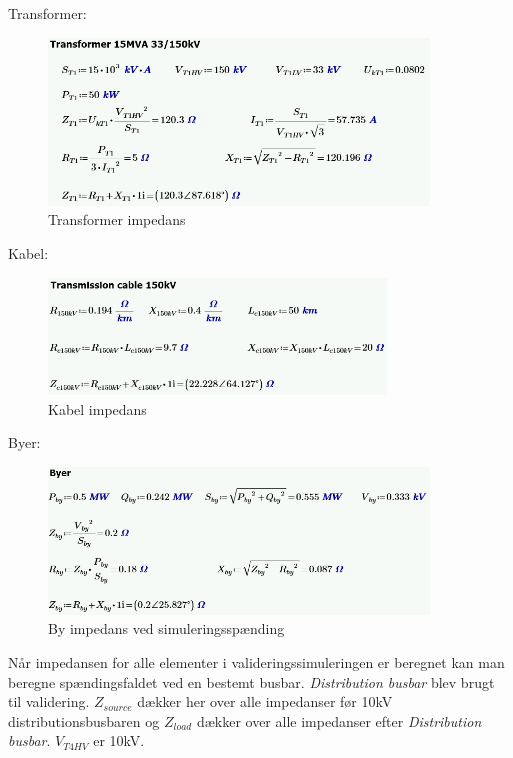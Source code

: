 Transformer:
\begin{figure}[H] %
	\centering
	\includegraphics[width=0.9\textwidth]{figurer/Transformer_validering}
	\caption{Transformer impedans}
	\label{fig:Trafoimpedans}
\end{figure}

Kabel:
\begin{figure}[H] %
	\centering
	\includegraphics[width=0.8\textwidth]{figurer/Kabel_validering}
	\caption{Kabel impedans}
	\label{fig:Kabelimpedans}
\end{figure}

Byer:
\begin{figure}[H] %
	\centering
	\includegraphics[width=0.9\textwidth]{figurer/By_validering}
	\caption{By impedans ved simuleringsspænding}
	\label{fig:Byimpedans}
\end{figure}

 Når impedansen for alle elementer i valideringssimuleringen er beregnet kan man beregne spændingsfaldet ved en bestemt busbar. \textit{Distribution busbar} blev brugt til validering. $Z_{source}$ dækker her over alle impedanser før 10kV distributionsbusbaren og $Z_{load}$ dækker over alle impedanser efter \textit{Distribution busbar}. $V_{T4HV}$ er 10kV.
 

